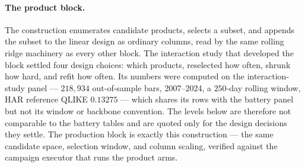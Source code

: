 \paragraph{The product block.}
The construction enumerates candidate products, selects a subset, and
appends the subset to the linear design as ordinary columns, read by the
same rolling ridge machinery as every other block. The interaction study
that developed the block settled four design choices: which products,
reselected how often, shrunk how hard, and refit how often. Its numbers
were computed on the interaction-study panel --- $218{,}934$ out-of-sample
bars, 2007--2024, a $250$-day rolling window, HAR reference QLIKE
$0.13275$ --- which shares its rows with the battery panel but not its
window or backbone convention. The levels below are therefore not
comparable to the battery tables and are quoted only for the design
decisions they settle.
The production block is exactly this construction --- the same candidate
space, selection window, and column scaling, verified against the campaign
executor that runs the product arms.

